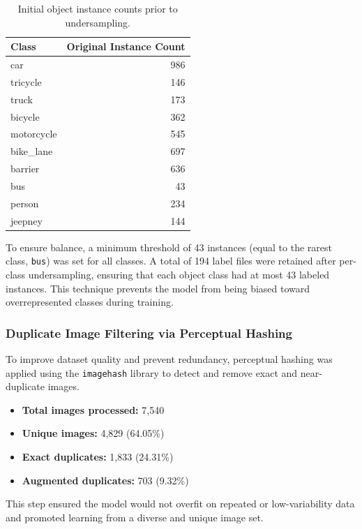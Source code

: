 \begin{table}[h]
\centering
\begin{tabular}{l r}
\toprule
\textbf{Class} & \textbf{Original Instance Count} \\
\midrule
car & 986 \\
tricycle & 146 \\
truck & 173 \\
bicycle & 362 \\
motorcycle & 545 \\
bike\_lane & 697 \\
barrier & 636 \\
bus & 43 \\
person & 234 \\
jeepney & 144 \\
\bottomrule
\end{tabular}
\caption{Initial object instance counts prior to undersampling.}
\label{tab:initial_class_counts}
\end{table}

To ensure balance, a minimum threshold of 43 instances (equal to the rarest class, \texttt{bus}) was set for all classes. A total of 194 label files were retained after per-class undersampling, ensuring that each object class had at most 43 labeled instances. This technique prevents the model from being biased toward overrepresented classes during training.

\subsubsection{Duplicate Image Filtering via Perceptual Hashing}

To improve dataset quality and prevent redundancy, perceptual hashing was applied using the \texttt{imagehash} library to detect and remove exact and near-duplicate images.

\begin{itemize}
    \item \textbf{Total images processed:} 7,540
    \item \textbf{Unique images:} 4,829 (64.05\%)
    \item \textbf{Exact duplicates:} 1,833 (24.31\%)
    \item \textbf{Augmented duplicates:} 703 (9.32\%)
\end{itemize}

This step ensured the model would not overfit on repeated or low-variability data and promoted learning from a diverse and unique image set.

